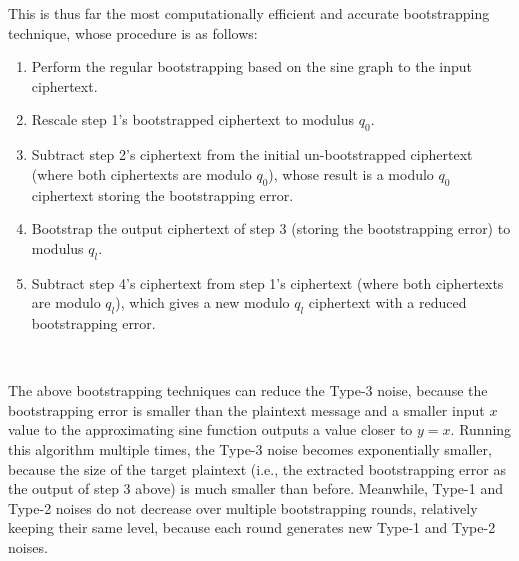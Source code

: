  This is thus far the most computationally efficient and accurate bootstrapping technique, whose procedure is as follows:
\begin{enumerate}
\item Perform the regular bootstrapping based on the sine graph to the input ciphertext.
\item Rescale step 1's bootstrapped ciphertext to modulus $q_0$.
\item Subtract step 2's ciphertext from the initial un-bootstrapped ciphertext (where both ciphertexts are modulo $q_0$), whose result is a modulo $q_0$ ciphertext storing the bootstrapping error.
\item Bootstrap the output ciphertext of step 3 (storing the bootstrapping error) to modulus $q_l$.
\item Subtract step 4's ciphertext from step 1's ciphertext (where both ciphertexts are modulo $q_l$), which gives a new modulo $q_l$ ciphertext with a reduced bootstrapping error.
\end{enumerate}

$ $

 The above bootstrapping techniques can reduce the Type-3 noise, because the bootstrapping error is smaller than the plaintext message and a smaller input $x$ value to the approximating sine function outputs a value closer to $y=x$. Running this algorithm multiple times, the Type-3 noise becomes exponentially smaller, because the size of the target plaintext (i.e., the extracted bootstrapping error as the output of step 3 above) is much smaller than before. Meanwhile, Type-1 and Type-2 noises do not decrease over multiple bootstrapping rounds, relatively keeping  their same level, because each round generates new Type-1 and Type-2 noises. 




